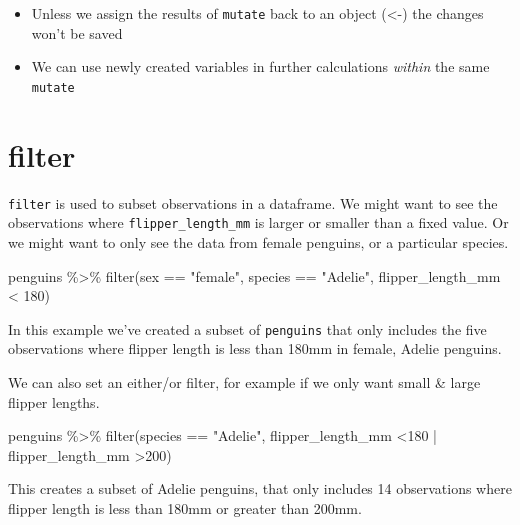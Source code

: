 \documentclass[
]{book}
\newenvironment{Shaded}{\begin{snugshade}}{\end{snugshade}}
\newcommand{\DecValTok}[1]{\textcolor[rgb]{0.00,0.00,0.81}{#1}}
\newcommand{\FunctionTok}[1]{\textcolor[rgb]{0.00,0.00,0.00}{#1}}
\newcommand{\NormalTok}[1]{#1}
\newcommand{\SpecialCharTok}[1]{\textcolor[rgb]{0.00,0.00,0.00}{#1}}
\newcommand{\StringTok}[1]{\textcolor[rgb]{0.31,0.60,0.02}{#1}}
\begin{document}
\begin{itemize}
\item
  Unless we assign the results of \texttt{mutate} back to an object (\textless-) the changes won't be saved
\item
  We can use newly created variables in further calculations \emph{within} the same \texttt{mutate}
\end{itemize}

\hypertarget{filter}{%
\section{filter}\label{filter}}

\texttt{filter} is used to subset observations in a dataframe. We might want to see the observations where \texttt{flipper\_length\_mm} is larger or smaller than a fixed value. Or we might want to only see the data from female penguins, or a particular species.

\begin{Shaded}
\begin{Highlighting}[]
\NormalTok{penguins }\SpecialCharTok{\%\textgreater{}\%} 
  \FunctionTok{filter}\NormalTok{(sex }\SpecialCharTok{==} \StringTok{"female"}\NormalTok{,}
\NormalTok{         species }\SpecialCharTok{==} \StringTok{"Adelie"}\NormalTok{,}
\NormalTok{         flipper\_length\_mm }\SpecialCharTok{\textless{}} \DecValTok{180}\NormalTok{)}
\end{Highlighting}
\end{Shaded}

In this example we've created a subset of \texttt{penguins} that only includes the five observations where flipper length is less than 180mm in female, Adelie penguins.

We can also set an either/or filter, for example if we only want small \& large flipper lengths.

\begin{Shaded}
\begin{Highlighting}[]
\NormalTok{penguins }\SpecialCharTok{\%\textgreater{}\%} 
  \FunctionTok{filter}\NormalTok{(species }\SpecialCharTok{==} \StringTok{"Adelie"}\NormalTok{, }
\NormalTok{         flipper\_length\_mm }\SpecialCharTok{\textless{}}\DecValTok{180} \SpecialCharTok{|} 
\NormalTok{           flipper\_length\_mm }\SpecialCharTok{\textgreater{}}\DecValTok{200}\NormalTok{)}
\end{Highlighting}
\end{Shaded}

This creates a subset of Adelie penguins, that only includes 14 observations where flipper length is less than 180mm or greater than 200mm.
\end{document}
